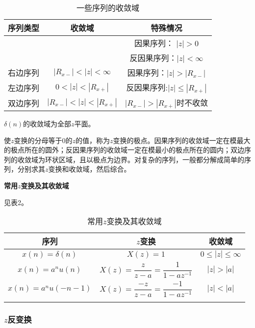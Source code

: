 \documentclass[cn, hazy, blue, normal, 12pt]{elegantnote}
\begin{document}
\begin{table}[htbp]
\centering
\caption{一些序列的收敛域}
\begin{tabular}{c|c|c}
    \toprule
    \textbf{序列类型} & \textbf{收敛域} & \textbf{特殊情况} \\
    \midrule
    {\multirow{2}{*}{有限长序列}} & {\multirow{2}{*}{$0<|z|<\infty$}} & 因果序列：   $|z|>0$      \\
    \cline{3-3}
    ~         & ~     &  反因果序列：$|z|<\infty$ \\
    \hline
    右边序列   & $|R_{x-}|<|z|<\infty$   & 因果序列：$|z|>|R_{x-}|$ \\
    \hline
    左边序列   & $0<|z|<|R_{x+}|$        & 反因果序列:$|z|\leq|R_{x+}|$ \\
    \hline
    双边序列   & $|R_{x-}|<|z|<|R_{x+}|$ & $|R_{x-}|>|R_{x+}|$时不收敛 \\
    \bottomrule
\end{tabular}
\end{table}

$\delta(n)$的收敛域为全部$z$平面。

使$z$变换的分母等于$0$的$z$的值，称为$z$变换的极点。因果序列的收敛域一定在模最大的极点所在的圆外；反因果序列的收敛域一定在模最小的极点所在的圆内；双边序列的收敛域为环状区域，且以极点为边界。对复杂的序列，一般都分解成简单的序列，分别求其$z$变换和收敛域，然后综合。

\textbf{常用$z$变换及其收敛域}

见表2。

\begin{table}[htbp]
\centering
\caption{常用$z$变换及其收敛域}
\begin{tabular}{c|c|c}
    \toprule
    \textbf{序列} & \textbf{$z$变换} & \textbf{收敛域} \\
    \midrule
    $x(n)=\delta(n)$  & $X(z)=1$ & $0\leq|z|\leq\infty$ \\
    \hline
    \addlinespace
    $x(n)=a^nu(n)$    & $X(z)=\dfrac{z}{z-a}=\dfrac{1}{1-az^{-1}}$ & $|z|>|a|$ \\
    \addlinespace
    \hline
    \addlinespace
    $x(n)=a^nu(-n-1)$ & $X(z)=\dfrac{-z}{z-a}=\dfrac{-1}{1-az^{-1}}$ & $|z|<|a|$ \\
    \addlinespace
    \bottomrule
\end{tabular}
\end{table}

\subsubsection{$z$反变换}
\end{document}
